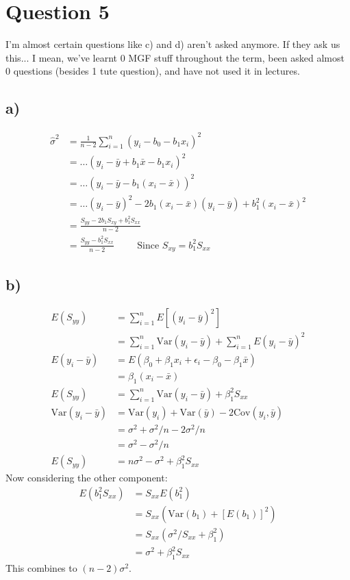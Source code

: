 \documentclass{article}
\begin{document}
\section*{Question 5}

I'm almost certain questions like c) and d) aren't asked anymore. If they ask us this... I mean,
we've learnt 0 MGF stuff throughout the term, been asked almost 0 questions (besides 1 tute question),
and have not used it in lectures.
\subsection*{a)}
\begin{align*}
\hat{\sigma}^2 &= \frac{1}{n-2} \sum_{i=1}^n (y_i - b_0 - b_1x_i)^2 \\ 
&= \dots  (y_i - \bar{y} + b_1\bar{x} - b_1x_i)^2 \\ 
&= \dots (y_i - \bar{y} - b_1(x_i - \bar{x}))^2 \\ 
&= \dots (y_i - \bar{y})^2 - 2b_1(x_i-\bar{x})(y_i-\bar{y}) + b_1^2(x_i - \bar{x})^2 \\ 
&= \frac{S_{yy} - 2b_1S_{xy} + b_1^2S_{xx}}{n - 2} \\ 
&= \frac{S_{yy} - b_1^2S_{xx}}{n - 2} \hspace{1cm} \text{Since } S_{xy} = b_1^2S_{xx}
\end{align*}
\subsection*{b)}
\begin{align*}
    E(S_{yy}) &= \sum_{i=1}^n E[(y_i - \bar{y})^2] \\
    &= \sum_{i=1}^n \text{Var}(y_i - \bar{y}) + \sum_{i=1}^nE(y_i - \bar{y})^2 \\ 
    E(y_i - \bar{y}) &= E(\beta_0 + \beta_1x_i + \epsilon_i - \beta_0 - \beta_1\bar{x}) \\ 
    &= \beta_1(x_i - \bar{x}) \\ 
    E(S_{yy}) &= \sum_{i=1}^n \text{Var}(y_i - \bar{y}) + \beta_1^2S_{xx} \\ 
    \text{Var}(y_i - \bar{y}) &= \text{Var}(y_i) + \text{Var}(\bar{y}) - 2\text{Cov}(y_i, \bar{y}) \\ 
    &= \sigma^2 + \sigma^2/n - 2\sigma^2/n \\ 
    &= \sigma^2 - \sigma^2/n \\ 
    E(S_{yy}) &= n\sigma^2 - \sigma^2 + \beta_1^2S_{xx}
\end{align*}
Now considering the other component:
\begin{align*}
    E(b_1^2S_{xx}) &= S_{xx}E(b_1^2) \\ 
    &= S_{xx}(\text{Var}(b_1) + [E(b_1)]^2) \\ 
    &= S_{xx}(\sigma^2/S_{xx} + \beta_1^2) \\ 
    &= \sigma^2 + \beta_1^2S_{xx}
\end{align*}
This combines to $(n-2)\sigma^2$.
\newpage 
\end{document}
